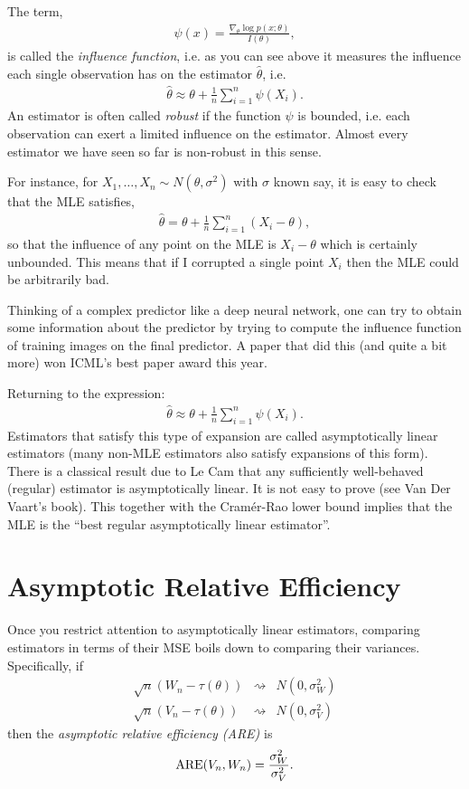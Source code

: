 \documentclass[twoside,12pt]{article}
\begin{document}
The term,
\begin{align*}
\psi(x) = \frac{\nabla_{\theta} \log p(x; \theta)}{I(\theta)},
\end{align*}
is called the \emph{influence function}, i.e. as you can see above it measures the influence each single observation has on the estimator $\widehat{\theta}$, i.e.
\begin{align*}
\widehat{\theta} \approx \theta + \frac{1}{n} \sum_{i=1}^n \psi(X_i).
\end{align*}
An estimator is often called \emph{robust} if the function $\psi$ is bounded, i.e. each observation can exert a limited influence on the estimator. Almost every estimator we have seen so far is non-robust in this sense. 

For instance, for $X_1,\ldots,X_n \sim N(\theta,\sigma^2)$ with $\sigma$ known say, it is easy to check that the MLE satisfies,
\begin{align*}
\widehat{\theta} = \theta + \frac{1}{n} \sum_{i=1}^n (X_i - \theta),
\end{align*}
so that the influence of any point on the MLE is $X_i - \theta$ which is certainly unbounded. This means that if I corrupted a single point $X_i$ then the MLE could be arbitrarily bad. 

Thinking of a complex predictor like a deep neural network, one can try to obtain some information about the predictor by trying to compute the influence function of training images on the final predictor. A paper that did this (and quite a bit more) won ICML's best paper award this year.

Returning to the expression:
\begin{align*}
\widehat{\theta} \approx \theta + \frac{1}{n} \sum_{i=1}^n \psi(X_i).
\end{align*}
Estimators that satisfy this type of expansion are called asymptotically linear estimators (many non-MLE estimators also satisfy expansions of this form). There is a classical result due to Le Cam that any sufficiently well-behaved (regular) estimator is asymptotically linear. It is not easy to prove (see Van Der Vaart's book). This together with the Cram\'{e}r-Rao lower bound implies that the MLE is the ``best regular asymptotically linear estimator''. 

\section{Asymptotic Relative Efficiency}
Once you restrict attention to asymptotically linear estimators, comparing estimators in terms of their MSE boils down to comparing their variances.
Specifically, if
\begin{eqnarray*}
\sqrt{n}(W_n - \tau(\theta)) & \rightsquigarrow & N(0,\sigma^2_W)\\
\sqrt{n}(V_n - \tau(\theta)) & \rightsquigarrow & N(0,\sigma^2_V)
\end{eqnarray*}
then the {\em asymptotic relative efficiency (ARE)} is
$$
{\rm ARE}(V_n,W_n) = \frac{\sigma^2_W}{\sigma^2_V}.
$$
\end{document}
